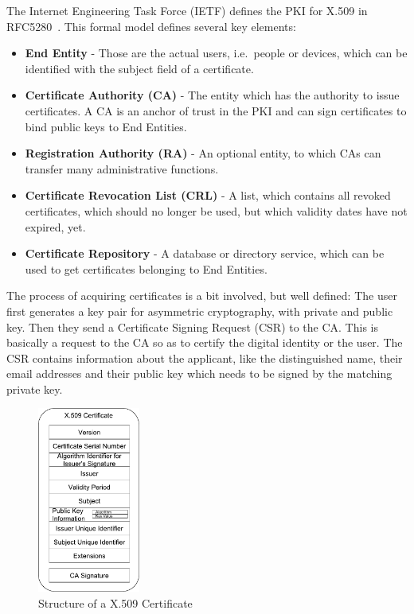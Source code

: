 The Internet Engineering Task Force (IETF) defines the PKI for X.509 in RFC5280~\cite{RFC5280}.
This formal model defines several key elements:
\begin{itemize}
    \item \textbf{End Entity} - Those are the actual users, i.e.\ people or devices, which can be identified with the
    subject field of a certificate.
    \item \textbf{Certificate Authority (CA)} - The entity which has the authority to issue certificates.
    A CA is an anchor of trust in the PKI and can sign certificates to bind public keys to End Entities.
    \item \textbf{Registration Authority (RA)} - An optional entity, to which CAs can transfer many administrative
    functions.
    \item \textbf{Certificate Revocation List (CRL)} - A list, which contains all revoked certificates, which should no
    longer be used, but which validity dates have not expired, yet.
    \item \textbf{Certificate Repository} - A database or directory service, which can be used to get certificates
    belonging to End Entities.
\end{itemize}

The process of acquiring certificates is a bit involved, but well defined:
The user first generates a key pair for asymmetric cryptography, with private and public key.
Then they send a Certificate Signing Request (CSR) to the CA\@.
This is basically a request to the CA so as to certify the digital identity or the user.
The CSR contains information about the applicant, like the distinguished name, their email addresses and their public
key which needs to be signed by the matching private key.

\begin{figure}
    \centering
    \includegraphics[width=0.3\textwidth]{figures/Structure_of_X509.pdf}
    \caption{Structure of a X.509 Certificate~\cite{jagdish2016certservice}}
    \label{fig:x509Structure}
\end{figure}

